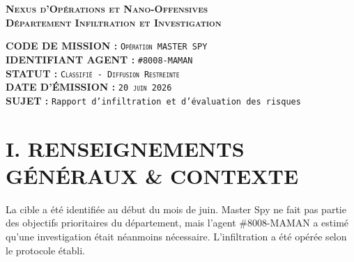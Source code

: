 \documentclass[11pt,a4paper]{article}
\begin{document}
\pagecolor{background}
\color{textcolor}

\begin{center}
    {\Huge \textbf{\scshape Nexus d'Opérations et Nano-Offensives}} \\
    \vspace{2mm}
    {\large \textbf{\scshape Département Infiltration et Investigation}} \\
    \noindent\makebox[\linewidth]{\rule{\textwidth}{1.2pt}}
\end{center}


\begin{flushleft}
    \textbf{CODE DE MISSION :} \texttt{\scshape Opération MASTER SPY} \\
    \textbf{IDENTIFIANT AGENT :} \texttt{\#8008-MAMAN} \\
    \textbf{STATUT :} \texttt{\scshape Classifié - Diffusion Restreinte} \\
    \textbf{DATE D'ÉMISSION :} \texttt{\scshape 20 juin 2026} \\
    \textbf{SUJET :} \texttt{Rapport d'infiltration et d'évaluation des risques} \\
\end{flushleft}

\noindent\makebox[\linewidth]{\rule{\textwidth}{0.8pt}}
\vspace{5mm}

\section*{\large I. RENSEIGNEMENTS GÉNÉRAUX \& CONTEXTE}

La cible a été identifiée au début du mois de juin. Master Spy ne fait pas partie des objectifs prioritaires du département, mais l'agent \#8008-MAMAN a estimé qu'une investigation était néanmoins nécessaire. L'infiltration a été opérée selon le protocole établi.
\end{document}
